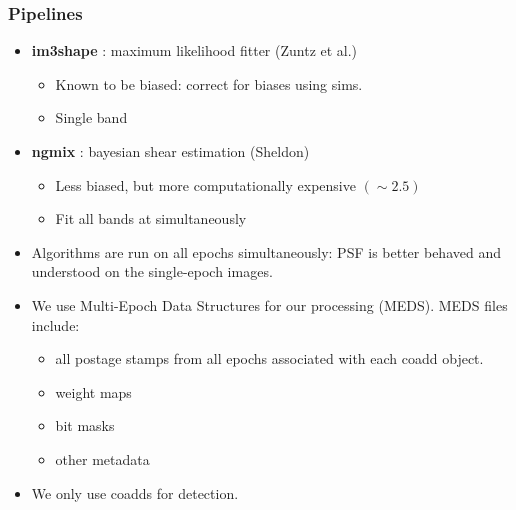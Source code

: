 \documentclass{beamer}
\newcommand{\ngmix}{ {\bf ngmix} }
\newcommand{\imshape}{ {\bf im3shape} }
\begin{document}
\frame
{
    \frametitle{Pipelines}

    \fontsize{9}{0.8\baselineskip}
    \begin{itemize}
        \item \imshape: maximum likelihood fitter (Zuntz et al.)
            \begin{itemize}
                \item Known to be biased: correct for biases using sims.
                \item Single band
            \end{itemize}
        \item \ngmix: bayesian shear estimation (Sheldon)
            \begin{itemize}
                \item Less biased, but more computationally expensive $(\sim 2.5)$
                \item Fit all bands at simultaneously
            \end{itemize}

        \item Algorithms are run on all epochs simultaneously: PSF is
            better behaved and understood on the single-epoch images.

        \item We use Multi-Epoch Data Structures for our processing (MEDS).
            MEDS files include:
            \begin{itemize}
                \item all postage stamps from all epochs associated with
                    each coadd object.
                \item weight maps
                \item bit masks
                \item other metadata
            \end{itemize}

        \item We only use coadds for detection.

    \end{itemize}
}
\end{document}
